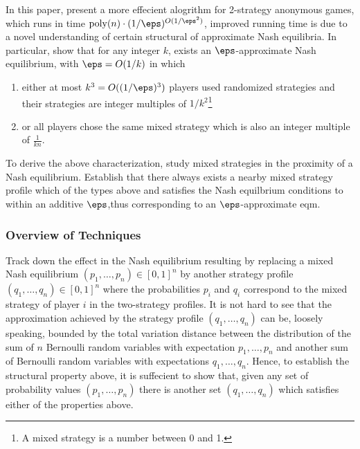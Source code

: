 In this paper, present a more effecient alogrithm for 2-strategy anonymous games, which runs in time $\poly(n)\cdot(1/\eps)^{O(1/\eps^2)}$, improved running time is due to a novel understanding of certain structural of approximate Nash equilibria. In particular, show that for any integer $k$, exists an $\eps$-approximate Nash equilibrium, with $\eps = O(1/k)$ in which
\begin{enumerate}
	\item either at most $k^3 = O((1/\eps)^3)$ players used randomized strategies and their strategies are integer multiples of $1/k^2$\footnote{A mixed strategy is a number between 0 and 1.}
	\item or all players chose the same mixed strategy which is also an integer multiple of $\frac{1}{kn}$.
\end{enumerate}

To derive the above characterization, study mixed strategies in the proximity of a Nash equilibrium. Establish that there always exists a nearby mixed strategy profile which of the types above and satisfies the Nash equilbrium conditions to within an additive $\eps$,thus corresponding to an $\eps$-approximate eqm. 

\subsubsection{Overview of Techniques}

Track down the effect in the Nash equilibrium resulting by replacing a mixed Nash equilibrium $(p_1, \dots, p_n) \in [0,1]^n$ by another strategy profile $(q_1, \dots, q_n)\in [0,1]^n$ where the probabilities $p_i$ and $q_i$ correspond to the mixed strategy of player $i$ in the two-strategy profiles. It is not hard to see that the approximation achieved by the strategy profile $(q_1, \dots, q_n)$ can be, loosely speaking, bounded by the total variation distance between the distribution of the sum of $n$ Bernoulli random variables with expectation $p_1, \dots, p_n$ and another sum of Bernoulli random variables with expectations $q_1, \dots, q_n$. Hence, to establish the structural property above, it is suffecient to show that, given any set of probability values $(p_1, \dots, p_n)$ there is another set $(q_1, \dots, q_n)$ which satisfies either of the properties above. 